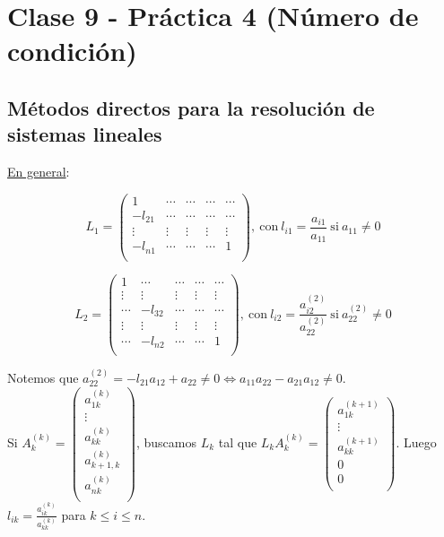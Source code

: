 \section{Clase 9 - Pr\'actica 4 (N\'umero de condici\'on)}

\subsection{M\'etodos directos para la resoluci\'on de sistemas lineales}

\underline{En general}:

$$ L_{1} =
	\begin{pmatrix}
        1 & \cdots & \cdots & \cdots & \cdots\\
        -l_{21} & \cdots & \cdots & \cdots & \cdots\\
        \vdots & \vdots & \vdots & \vdots & \vdots\\
        -l_{n1} & \cdots & \cdots &\cdots & 1\\
	\end{pmatrix}
	,\ \text{con}\ l_{i1} = \frac{a_{i1}}{a_{11}}\ \text{si}\ a_{11} \neq 0
$$

$$ L_{2} =
	\begin{pmatrix}
        1 & \cdots & \cdots & \cdots & \cdots\\
        \vdots & \vdots & \vdots & \vdots & \vdots\\
        \cdots & -l_{32} & \cdots & \cdots & \cdots\\
        \vdots & \vdots & \vdots & \vdots & \vdots\\
        \cdots & -l_{n2} & \cdots & \cdots & 1\\
	\end{pmatrix}
	,\ \text{con}\ l_{i2} = \frac{a_{i2}^{(2)}}{a_{22}^{(2)}}\ \text{si}\ a_{22}^{(2)} \neq 0
$$

Notemos que $a_{22}^{(2)} = -l_{21}a_{12} + a_{22} \neq 0 \iff a_{11}a_{22} - a_{21}a_{12} \neq 0$.\\

Si $ A_{k}^{(k)} =
	\begin{pmatrix}
        a_{1k}^{(k)}\\
        \vdots\\
        a_{kk}^{(k)}\\
        a_{k + 1, k}^{(k)}\\
        a_{nk}^{(k)}\\
	\end{pmatrix}
$, buscamos $L_{k}$ tal que $ L_{k}A_{k}^{(k)} =
	\begin{pmatrix}
        a_{1k}^{(k + 1)}\\
        \vdots\\
        a_{kk}^{(k + 1)}\\
        0\\
        0\\
	\end{pmatrix}
$. Luego $l_{ik} = \frac{a_{ik}^{(k)}}{a_{kk}^{(k)}}$ para $k \leq i \leq n$.

